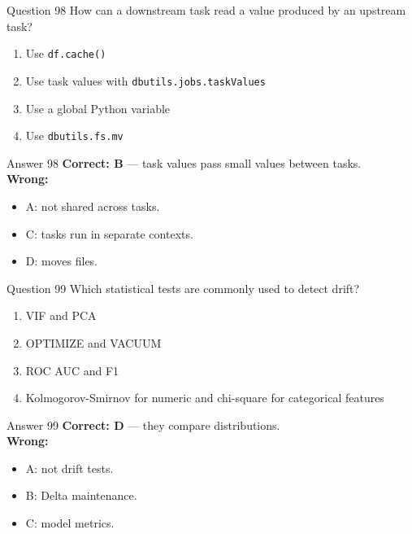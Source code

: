 \documentclass[aspectratio=169,11pt]{beamer}
\begin{document}
\begin{frame}{Question 98}
How can a downstream task read a value produced by an upstream task?
\begin{enumerate}[label=\Alph*.]
\item Use \texttt{df.cache()}
\item Use task values with \texttt{dbutils.jobs.taskValues}
\item Use a global Python variable
\item Use \texttt{dbutils.fs.mv}
\end{enumerate}
\end{frame}
\begin{frame}{Answer 98}
\textbf{Correct: B} --- task values pass small values between tasks.\\
\vspace{0.5em}
\textbf{Wrong:}
\begin{itemize}
\item A: not shared across tasks.
\item C: tasks run in separate contexts.
\item D: moves files.
\end{itemize}
\end{frame}

\begin{frame}{Question 99}
Which statistical tests are commonly used to detect drift?
\begin{enumerate}[label=\Alph*.]
\item VIF and PCA
\item OPTIMIZE and VACUUM
\item ROC AUC and F1
\item Kolmogorov-Smirnov for numeric and chi-square for categorical features
\end{enumerate}
\end{frame}
\begin{frame}{Answer 99}
\textbf{Correct: D} --- they compare distributions.\\
\vspace{0.5em}
\textbf{Wrong:}
\begin{itemize}
\item A: not drift tests.
\item B: Delta maintenance.
\item C: model metrics.
\end{itemize}
\end{frame}
\end{document}
